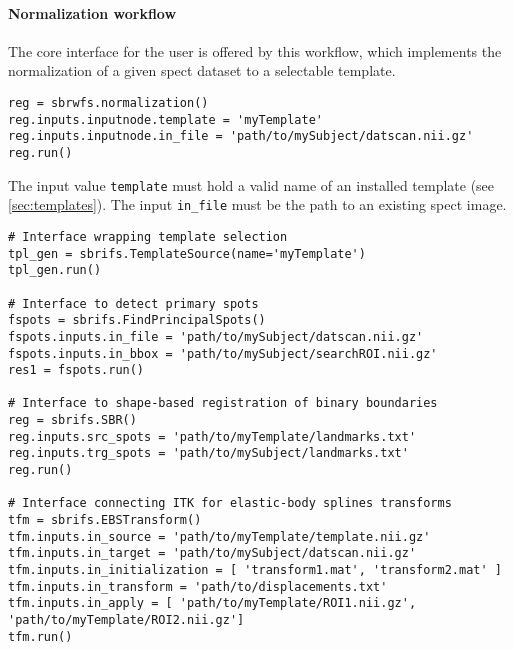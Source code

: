 \documentclass{frontiers}
\begin{document}
\paragraph{Normalization workflow} %
The core interface for the user is offered by this workflow,
  which implements the normalization of a given \gls*{spect} 
  dataset to a selectable template.
\begin{lstlisting}[float,caption={\label{list:fullreg}Running a full template-subject registration}]
reg = sbrwfs.normalization()
reg.inputs.inputnode.template = 'myTemplate'
reg.inputs.inputnode.in_file = 'path/to/mySubject/datscan.nii.gz'
reg.run()
\end{lstlisting}
The input value \texttt{template} must hold a valid name of an installed 
  template (see \autoref{sec:templates}). 
The input \texttt{in\_file} must be the path to an existing \gls*{spect} image.
\cbend

\begin{lstlisting}[caption={\label{list:interfaces}\textbf{Exemplary execution
  of individual Interfaces.} %
For briefness, all the optional parameters have been omitted here, please refer
   to the project's website for full documentation.}]
# Interface wrapping template selection
tpl_gen = sbrifs.TemplateSource(name='myTemplate')
tpl_gen.run()

# Interface to detect primary spots
fspots = sbrifs.FindPrincipalSpots()
fspots.inputs.in_file = 'path/to/mySubject/datscan.nii.gz'
fspots.inputs.in_bbox = 'path/to/mySubject/searchROI.nii.gz'
res1 = fspots.run()

# Interface to shape-based registration of binary boundaries
reg = sbrifs.SBR()
reg.inputs.src_spots = 'path/to/myTemplate/landmarks.txt'
reg.inputs.trg_spots = 'path/to/mySubject/landmarks.txt'
reg.run()

# Interface connecting ITK for elastic-body splines transforms
tfm = sbrifs.EBSTransform()
tfm.inputs.in_source = 'path/to/myTemplate/template.nii.gz'
tfm.inputs.in_target = 'path/to/mySubject/datscan.nii.gz'
tfm.inputs.in_initialization = [ 'transform1.mat', 'transform2.mat' ]
tfm.inputs.in_transform = 'path/to/displacements.txt'
tfm.inputs.in_apply = [ 'path/to/myTemplate/ROI1.nii.gz', 'path/to/myTemplate/ROI2.nii.gz']
tfm.run()
\end{lstlisting}
\end{document}
